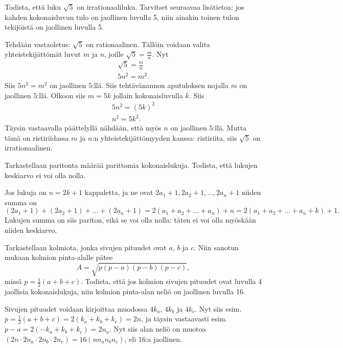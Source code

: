 \begin{kotitehtavasivu}
	\begin{tehtava}
		Todista, että luku $\sqrt{5}$ on irrationaaliluku.
		Tarvitset seuraavaa lisätietoa: jos kahden kokonaisluvun
		tulo on jaollinen luvulla 5, niin ainakin toinen tulon
		tekijöistä on jaollinen luvulla 5.
		\begin{vastaus}
			Tehdään vastaoletus: $\sqrt{5}$ on rationaalinen. Tällöin voidaan valita yhteistekijättömät luvut $m$ ja $n$, joille $\sqrt{5} = \frac{m}{n}$. Nyt
			\begin{align*}
				\sqrt{5} = \frac{m}{n} \\
				5n^2 = m^2.
			\end{align*}
			Siis $5n^2 = m^2$ on jaollinen  $5$:llä. Siis tehtävänannon aputuloksen nojalla $m$ on jaollinen $5$:llä. Olkoon siis $m = 5k$ jollain kokonaisluvulla $k$. Siis
			\begin{align*}
				5n^2 = \left(5k\right)^2 \\
				n^2 = 5k^2.
			\end{align*}
			Täysin vastaavalla päättelyllä nähdään, että myös $n$ on jaollinen $5$:llä. Mutta tämä on ristiriidassa $m$ ja $n$:n yhteistekijättömyyden kanssa: ristiriita, siis $\sqrt{5}$ on irrationaalinen.
		\end{vastaus}
	\end{tehtava}

	\begin{tehtava}
		Tarkastellaan paritonta määrää parittomia kokonaislukuja.
		Todista, että lukujen keskiarvo ei voi olla nolla.
		\begin{vastaus}
			Jos lukuja on $n = 2k + 1$ kappaletta, ja ne ovat $2a_1 + 1, 2a_2+1,  \ldots, 2a_{n} + 1$ niiden summa on
			\[
			(2a_1 + 1) + (2a_2+1) +  \ldots + (2a_{n} + 1) = 2(a_1 + a_2 +  \ldots +a_{n}) + n =  2(a_1 + a_2 +  \ldots +a_{n} + k) + 1.
			\]
			Lukujen summa on siis pariton, eikä se voi olla nolla: täten ei voi olla myöskään niiden keskiarvo.
		\end{vastaus}
	\end{tehtava}

	\begin{tehtava}
		Tarkastellaan kolmiota, jonka sivujen pituudet ovat
		$a$, $b$ ja $c$. Niin sanotun  mukaan
		kolmion pinta-alalle pätee \[A = \sqrt{p(p-a)(p-b)(p-c)},\]
		missä $p = \frac{1}{2}(a+b+c)$. Todista, että jos kolmion
		sivujen pituudet ovat luvulla 4 jaollisia kokonaislukuja,
		niin kolmion pinta-alan neliö on jaollinen luvulla 16.
		\begin{vastaus}
			Sivujen pituudet voidaan kirjoittaa muodossa $4k_a$, $4k_b$ ja  $4k_c$. Nyt siis esim. $p = \frac{1}{2}(a+b+c) = 2(k_a + k_b + k_c) = 2n$, ja täysin vastaavasti esim. $p - a =2(-k_a + k_b + k_c) = 2n_a$. Nyt siis alan neliö on muotoa $(2n \cdot 2n_{a} \cdot 2n_{b} \cdot 2n_{c}) = 16(nn_an_bn_c)$, eli $16$:a jaollinen. 
		\end{vastaus}
	\end{tehtava}


\end{kotitehtavasivu}
